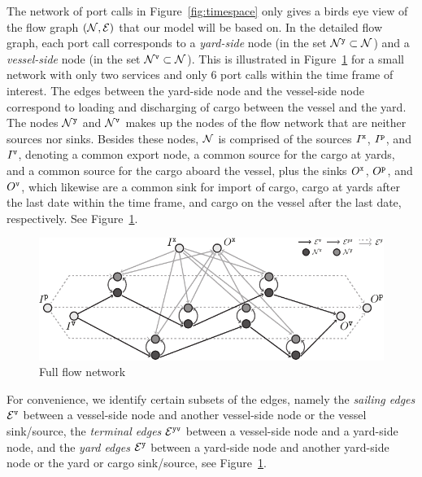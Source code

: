 The network of port calls in Figure~\ref{fig:timespace} only gives a birds eye view of the flow graph $(\mathcal{N},\mathcal{E})$ that our model will be based on. In the detailed flow graph, each port call corresponds to a \emph{yard-side} node (in the set $\mathcal{N}^\texttt{y}\subset \mathcal{N}$) and a \emph{vessel-side} node (in the set $\mathcal{N}^\texttt{v}\subset\mathcal{N}$). This is illustrated in Figure~\ref{fig:flow} for a small network with only two services and only 6 port calls within the time frame of interest. The edges between the yard-side node and the vessel-side node correspond to loading and discharging of cargo between the vessel and the yard. The nodes $\mathcal{N}^\texttt{y}$ and $\mathcal{N}^\texttt{v}$ makes up the nodes of the flow network that are neither sources nor sinks. %
Besides these nodes, $\mathcal{N}$ is comprised of the sources $I^\texttt{x}$, $I^\texttt{p}$, and $I^\texttt{v}$, denoting a common export node, a common source for the cargo at yards, and a common source for the cargo aboard the vessel, plus the sinks $O^\texttt{x}$, $O^\texttt{p}$, and $O^\texttt{v}$, which likewise are a common sink for import of cargo, cargo at yards after the last date within the time frame, and cargo on the vessel after the last date, respectively. See Figure~\ref{fig:flow}.
%
\begin{figure}
	\centering
		\includegraphics[scale = 1]{figures/fullFlow.pdf}
		\caption{Full flow network}  \label{fig:flow}
\end{figure}
%
For convenience, we identify certain subsets of the edges, namely the \emph{sailing edges} $\mathcal{E}^\texttt{v}$ between a vessel-side node and another vessel-side node or the vessel sink/source, %
the \emph{terminal edges} $\mathcal{E}^\texttt{yv}$ between a vessel-side node and a yard-side node, %
and the \emph{yard edges} $\mathcal{E}^{\texttt{y}}$ between a yard-side node and another yard-side node or the yard or cargo sink/source, %
see Figure~\ref{fig:flow}.

